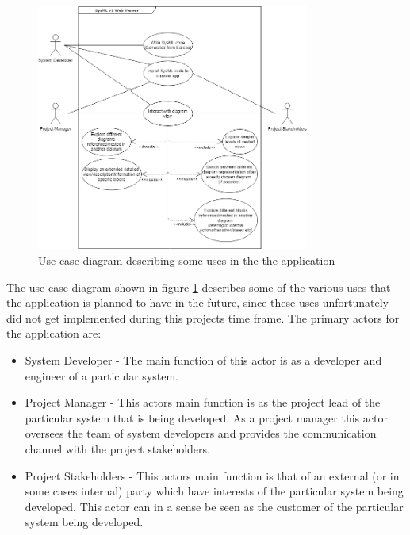 \documentclass{article}
\begin{document}
\begin{figure}[H]
    \begin{center}
        \includegraphics[width=0.8\textwidth]{Use-case_SysMLProject.png}
        \caption{Use-case diagram describing some uses in the the application}
        \label{use-case}
    \end{center}
\end{figure}
The use-case diagram shown in figure \ref{use-case} describes some of the various uses that the application is planned to have in the future, since these uses unfortunately did not get implemented during this projects time frame. The primary actors for the application are: 
\begin{itemize}
  \item System Developer - The main function of this actor is as a developer and engineer of a particular system. 
  \item Project Manager - This actors main function is as the project lead of the particular system that is being developed. As a project manager this actor oversees the team of system developers and provides the communication channel with the project stakeholders.
  \item Project Stakeholders - This actors main function is that of an external (or in some cases internal) party which have interests of the particular system being developed. This actor can in a sense be seen as the customer of the particular system being developed.
\end{itemize}
\end{document}
